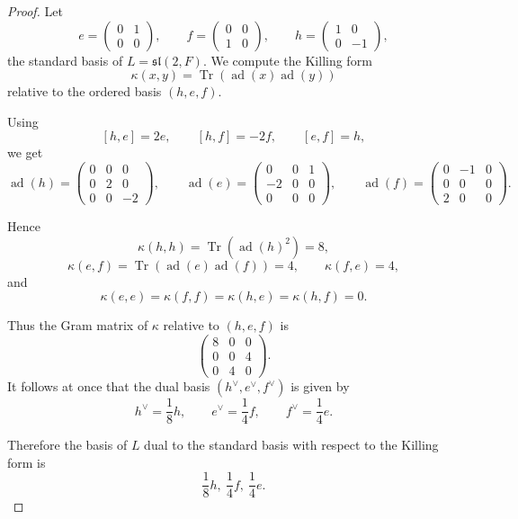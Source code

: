 \begin{proof}
    Let
    \[
        e=\begin{pmatrix}0&1\\0&0\end{pmatrix},\qquad
        f=\begin{pmatrix}0&0\\1&0\end{pmatrix},\qquad
        h=\begin{pmatrix}1&0\\0&-1\end{pmatrix},
    \]
    the standard basis of \(L=\mathfrak{sl}(2,F)\). We compute the Killing form
    \[
        \kappa(x,y)=\operatorname{Tr}(\operatorname{ad}(x)\operatorname{ad}(y))
    \]
    relative to the ordered basis \((h,e,f)\).

    Using
    \[
        [h,e]=2e,\qquad [h,f]=-2f,\qquad [e,f]=h,
    \]
    we get
    \[
        \operatorname{ad}(h)=
        \begin{pmatrix}
            0 & 0 & 0  \\
            0 & 2 & 0  \\
            0 & 0 & -2
        \end{pmatrix},
        \qquad
        \operatorname{ad}(e)=
        \begin{pmatrix}
            0  & 0 & 1 \\
            -2 & 0 & 0 \\
            0  & 0 & 0
        \end{pmatrix},
        \qquad
        \operatorname{ad}(f)=
        \begin{pmatrix}
            0 & -1 & 0 \\
            0 & 0  & 0 \\
            2 & 0  & 0
        \end{pmatrix}.
    \]

    Hence
    \[
        \kappa(h,h)=\operatorname{Tr}(\operatorname{ad}(h)^2)=8,
    \]
    \[
        \kappa(e,f)=\operatorname{Tr}(\operatorname{ad}(e)\operatorname{ad}(f))=4,
        \qquad
        \kappa(f,e)=4,
    \]
    and
    \[
        \kappa(e,e)=\kappa(f,f)=\kappa(h,e)=\kappa(h,f)=0.
    \]

    Thus the Gram matrix of \(\kappa\) relative to \((h,e,f)\) is
    \[
        \begin{pmatrix}
            8 & 0 & 0 \\
            0 & 0 & 4 \\
            0 & 4 & 0
        \end{pmatrix}.
    \]
    It follows at once that the dual basis \((h^\vee,e^\vee,f^\vee)\) is given by
    \[
        h^\vee=\frac18 h,\qquad e^\vee=\frac14 f,\qquad f^\vee=\frac14 e.
    \]

    Therefore the basis of \(L\) dual to the standard basis with respect to the Killing form is
    \[
        \boxed{\frac18 h,\ \frac14 f,\ \frac14 e.}
    \]
\end{proof}

